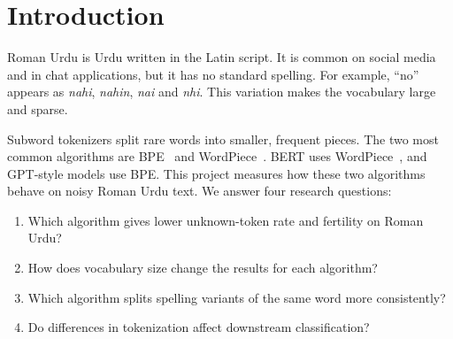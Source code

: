 \documentclass[11pt,a4paper]{article}
\begin{document}
\begin{abstract}
Roman Urdu has no standard spelling, so one word appears in many written forms. We compare two subword tokenization algorithms, Byte-Pair Encoding (BPE) and WordPiece, on 19{,}489 Roman Urdu social media sentences. We train each algorithm at four vocabulary sizes (1k, 4k, 8k and 16k) and measure unknown-token rate, fertility, spelling-variant consistency and downstream sentiment classification performance. BPE produces slightly fewer tokens per word than WordPiece at every vocabulary size. Neither algorithm produces unknown tokens on the cleaned text. Both algorithms split spelling variants inconsistently, and consistency falls as the vocabulary grows, because frequent variants become separate whole-word tokens. Downstream, the best subword tokenizers (WordPiece-4k: 63.37 macro F1; BPE-16k: 63.26) perform about the same as a plain word-level baseline (63.13). For Roman Urdu, the choice between BPE and WordPiece matters less than the vocabulary size, and subword tokenization alone does not solve spelling variation. A stronger classifier that combines word and character n-grams reaches 67.93\% accuracy on the 3-class task and 80.70\% on positive vs.\ negative.
\end{abstract}

\section{Introduction}
Roman Urdu is Urdu written in the Latin script. It is common on social media and in chat applications, but it has no standard spelling. For example, ``no'' appears as \textit{nahi}, \textit{nahin}, \textit{nai} and \textit{nhi}. This variation makes the vocabulary large and sparse.

Subword tokenizers split rare words into smaller, frequent pieces. The two most common algorithms are BPE~\cite{sennrich2016} and WordPiece~\cite{schuster2012}. BERT uses WordPiece~\cite{devlin2019}, and GPT-style models use BPE. This project measures how these two algorithms behave on noisy Roman Urdu text. We answer four research questions:
\begin{enumerate}[label=\textbf{RQ\arabic*.},leftmargin=*]
  \item Which algorithm gives lower unknown-token rate and fertility on Roman Urdu?
  \item How does vocabulary size change the results for each algorithm?
  \item Which algorithm splits spelling variants of the same word more consistently?
  \item Do differences in tokenization affect downstream classification?
\end{enumerate}
\end{document}
